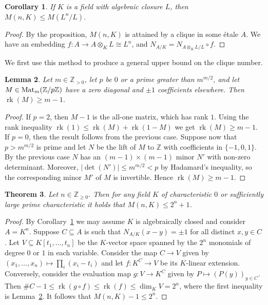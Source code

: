 \documentclass{amsart}
\theoremstyle{plain}
\newtheorem{theorem}{Theorem}[section]
\newtheorem{lemma}[theorem]{Lemma}
\newtheorem{corollary}[theorem]{Corollary}
\theoremstyle{definition}
\DeclareMathOperator{\rk}{rk}
\newcommand{\tensor}{\otimes}
\newcommand{\Z}{\ensuremath{\mathbb{Z}}}
\newcommand{\clq}{C}
\begin{document}
\begin{corollary}\label{cor:split_bound}
	If \(K\) is a field with algebraic closure \(L\), then \(M(n,K)\leq M(L^n/L)\).
\end{corollary}
\begin{proof}
	By the proposition, \(M(n,K)\) is attained by a clique in some \'etale \(A\). We have an embedding \(f:A\to A\tensor_K L \cong L^n\), and \(N_{A/K} = N_{A\tensor_K L /L} \circ f\).
\end{proof}

We first use this method to produce a general upper bound on the clique number.


\begin{lemma}\label{lem:ugly_matrix}
	Let $m\in\Z_{>0}$, let \(p\) be \(0\) or a prime greater than \(m^{m/2}\), and let $M\in\textup{Mat}_m(\Z/p\Z)$ have a zero diagonal and $\pm1$ coefficients elsewhere. Then $\rk(M)\ge m-1$.
\end{lemma}

\begin{proof}
	If \(p=2\), then \(M-1\) is the all-one matrix, which has rank \(1\). Using the rank inequality \(\rk(1)\leq\rk(M)+\rk(1-M)\) we get \(\rk(M)\geq m-1\).
	If \(p=0\), then the result follows from the previous case.
	Suppose now that \(p>m^{m/2}\) is prime and let \(N\) be the lift of \(M\) to \(\Z\) with coefficients in \(\{-1,0,1\}\). 
	By the previous case \(N\) has an \((m-1)\times(m-1)\) minor \(N'\) with non-zero determinant.
	Moreover, \(|\det(N')|\leq m^{m/2}<p\) by Hadamard's inequality, so the corresponding minor \(M'\) of \(M\) is invertible. Hence \(\rk(M)\geq m-1\).
\end{proof}

\begin{theorem}\label{thm:field_upper_bound}
	Let \(n\in\Z_{\geq0}\). Then for any field \(K\) of characteristic \(0\) or sufficiently large prime characteristic it holds that \(M(n,K)\leq 2^n+1\).
\end{theorem}
\begin{proof}
	By Corollary~\ref{cor:split_bound} we may assume \(K\) is algebraically closed and consider \(A=K^n\).
	Suppose $\clq\subseteq A$ is such that $N_{A/K}(x-y)=\pm1$ for all distinct $x,y\in \clq$.
	Let \(V\subseteq K[t_1,\dotsc,t_n]\) be the \(K\)-vector space spanned by the \(2^n\) monomials of degree \(0\) or \(1\) in each variable. 
	Consider the map \(\clq\to V\) given by \((x_1,\dotsc,x_n)\mapsto \prod_i (x_i-t_i)\) and let \(f:K^\clq\to V\) be its \(K\)-linear extension. 
	Conversely, consider the evaluation map \(g:V\to K^\clq\) given by \(P\mapsto (P(y))_{y\in \clq}\).
	Then \(\#\clq-1\leq \rk(g\circ f) \leq \rk(f) \leq \dim_K V = 2^n\), where the first inequality is Lemma~\ref{lem:ugly_matrix}. It follows that \(M(n,K)-1\leq2^n\).
\end{proof}
\end{document}
